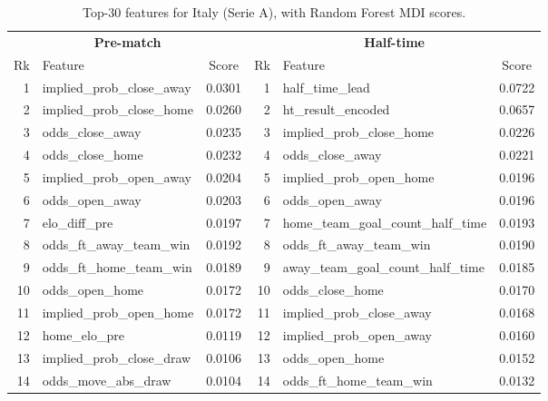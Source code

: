 \documentclass[pdflatex,sn-mathphys-num]{sn-jnl}
\theoremstyle{thmstyleone}
\theoremstyle{thmstyletwo}
\theoremstyle{thmstylethree}
\begin{document}
\begin{table}[h]
\caption{Top-30 features for Italy (Serie A), with Random Forest MDI scores.}\label{tab:fi-ita}
\footnotesize
\begin{tabular*}{\textwidth}{@{\extracolsep\fill}rlc|rlc@{}}
\toprule
\multicolumn{3}{c|}{\textbf{Pre-match}} & \multicolumn{3}{c}{\textbf{Half-time}} \\
Rk & Feature & Score & Rk & Feature & Score \\
\midrule
1  & implied\_prob\_close\_away          & 0.0301 & 1  & half\_time\_lead                       & 0.0722 \\
2  & implied\_prob\_close\_home          & 0.0260 & 2  & ht\_result\_encoded                    & 0.0657 \\
3  & odds\_close\_away                  & 0.0235 & 3  & implied\_prob\_close\_home              & 0.0226 \\
4  & odds\_close\_home                  & 0.0232 & 4  & odds\_close\_away                       & 0.0221 \\
5  & implied\_prob\_open\_away           & 0.0204 & 5  & implied\_prob\_open\_home               & 0.0196 \\
6  & odds\_open\_away                   & 0.0203 & 6  & odds\_open\_away                        & 0.0196 \\
7  & elo\_diff\_pre                     & 0.0197 & 7  & home\_team\_goal\_count\_half\_time     & 0.0193 \\
8  & odds\_ft\_away\_team\_win          & 0.0192 & 8  & odds\_ft\_away\_team\_win               & 0.0190 \\
9  & odds\_ft\_home\_team\_win          & 0.0189 & 9  & away\_team\_goal\_count\_half\_time     & 0.0185 \\
10 & odds\_open\_home                   & 0.0172 & 10 & odds\_close\_home                       & 0.0170 \\
11 & implied\_prob\_open\_home           & 0.0172 & 11 & implied\_prob\_close\_away              & 0.0168 \\
12 & home\_elo\_pre                     & 0.0119 & 12 & implied\_prob\_open\_away               & 0.0160 \\
13 & implied\_prob\_close\_draw          & 0.0106 & 13 & odds\_open\_home                        & 0.0152 \\
14 & odds\_move\_abs\_draw               & 0.0104 & 14 & odds\_ft\_home\_team\_win               & 0.0132 \\

\end{tabular*}
\end{table}
\end{document}
